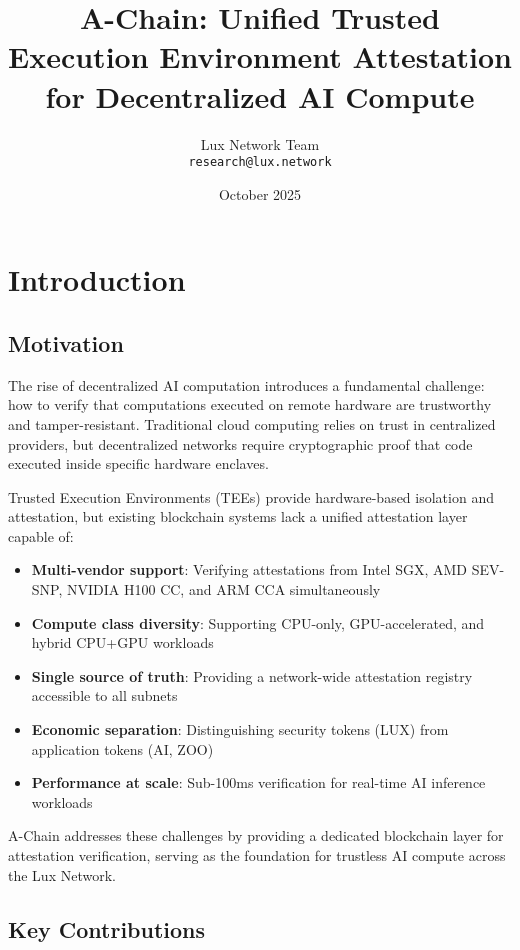 \documentclass[11pt,a4paper]{article}
\title{A-Chain: Unified Trusted Execution Environment Attestation for Decentralized AI Compute}
\author{
Lux Network Team\\
\texttt{research@lux.network}
}
\date{October 2025}
\begin{document}
\maketitle

\section{Introduction}

\subsection{Motivation}

The rise of decentralized AI computation introduces a fundamental challenge: how to verify that computations executed on remote hardware are trustworthy and tamper-resistant. Traditional cloud computing relies on trust in centralized providers, but decentralized networks require cryptographic proof that code executed inside specific hardware enclaves.

Trusted Execution Environments (TEEs) provide hardware-based isolation and attestation, but existing blockchain systems lack a unified attestation layer capable of:

\begin{itemize}
\item \textbf{Multi-vendor support}: Verifying attestations from Intel SGX, AMD SEV-SNP, NVIDIA H100 CC, and ARM CCA simultaneously
\item \textbf{Compute class diversity}: Supporting CPU-only, GPU-accelerated, and hybrid CPU+GPU workloads
\item \textbf{Single source of truth}: Providing a network-wide attestation registry accessible to all subnets
\item \textbf{Economic separation}: Distinguishing security tokens (LUX) from application tokens (AI, ZOO)
\item \textbf{Performance at scale}: Sub-100ms verification for real-time AI inference workloads
\end{itemize}

A-Chain addresses these challenges by providing a dedicated blockchain layer for attestation verification, serving as the foundation for trustless AI compute across the Lux Network.

\subsection{Key Contributions}
\end{document}
